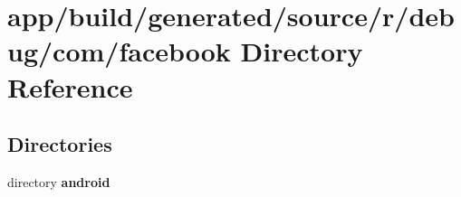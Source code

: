 \section{app/build/generated/source/r/debug/com/facebook Directory Reference}
\label{dir_5ae46528a49fa48942ab7441aa212428}
\subsection*{Directories}
\begin{DoxyCompactItemize}
\item 
directory {\bf android}
\end{DoxyCompactItemize}

